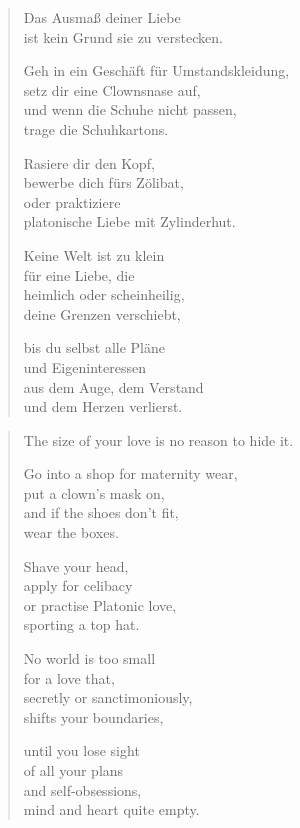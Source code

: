
\cleartoverso


\begin{verse}

Das Ausmaß deiner Liebe\\
ist kein Grund sie zu verstecken.

Geh in ein Geschäft für Umstandskleidung,\\
setz dir eine Clownsnase auf,\\
und wenn die Schuhe nicht passen,\\
trage die Schuhkartons.

Rasiere dir den Kopf,\\
bewerbe dich fürs Zölibat,\\
oder praktiziere\\
platonische Liebe mit Zylinderhut.

Keine Welt ist zu klein\\
für eine Liebe, die\\
heimlich oder scheinheilig,\\
deine Grenzen verschiebt,

bis du selbst alle Pläne\\
und Eigeninteressen\\
aus dem Auge, dem Verstand\\
und dem Herzen verlierst.
\end{verse}

\clearpage


\begin{verse}

The size of your love is no reason to hide it.

Go into a shop for maternity wear,\\
put a clown's mask on,\\
and if the shoes don't fit,\\
wear the boxes.

Shave your head,\\
apply for celibacy\\
or practise Platonic love,\\
sporting a top hat.

No world is too small\\
for a love that,\\
secretly or sanctimoniously,\\
shifts your boundaries,

until you lose sight\\
of all your plans\\
and self-obsessions,\\
mind and heart quite empty.

\end{verse}

